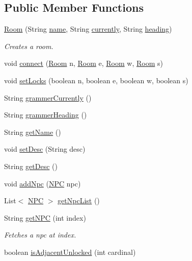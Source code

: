 \subsection*{Public Member Functions}
\begin{DoxyCompactItemize}
\item 
\hyperlink{classRoom_ae162f5cbb105a45bb5b72adcccfd250f}{Room} (String \hyperlink{classRoom_a30e9fb0290f64b567572d2f4b4fac4d9}{name}, String \hyperlink{classRoom_a2f0c64fd0d90618f9c36b935a6f6bb49}{currently}, String \hyperlink{classRoom_ad9e86528519166f3ac3b1413da4e0a41}{heading})
\begin{DoxyCompactList}\small\item\em Creates a room. \end{DoxyCompactList}\item 
void \hyperlink{classRoom_af82990e218a9dced9c6226b0083bfb8a}{connect} (\hyperlink{classRoom}{Room} n, \hyperlink{classRoom}{Room} e, \hyperlink{classRoom}{Room} w, \hyperlink{classRoom}{Room} s)
\item 
void \hyperlink{classRoom_a074e41e5dbc41dd4a71cac2a101c1f56}{set\+Locks} (boolean n, boolean e, boolean w, boolean s)
\item 
String \hyperlink{classRoom_aa0c9b6ddd98d29a9cc4e31c6c66a8ea4}{grammer\+Currently} ()
\item 
String \hyperlink{classRoom_a8d2578df19ba7b0d5c76c9567aba83df}{grammer\+Heading} ()
\item 
String \hyperlink{classRoom_ab638bfd4155075a97e6d3ec306b467f0}{get\+Name} ()
\item 
void \hyperlink{classRoom_adefdb50c618b7d7d91fb2025eefc39e0}{set\+Desc} (String desc)
\item 
String \hyperlink{classRoom_ad0996a895179c9ba712e5be94534e58e}{get\+Desc} ()
\item 
void \hyperlink{classRoom_ac6f911c07206b270b6d821f0b9a67a01}{add\+Npc} (\hyperlink{classNPC}{N\+P\+C} npc)
\item 
List$<$ \hyperlink{classNPC}{N\+P\+C} $>$ \hyperlink{classRoom_a0c5b0189a4149e963ac93965acbf8088}{get\+Npc\+List} ()
\item 
String \hyperlink{classRoom_a74ac6cc2152ba812702258b9c4fd70db}{get\+N\+P\+C} (int index)
\begin{DoxyCompactList}\small\item\em Fetches a npc at index. \end{DoxyCompactList}\item 
boolean \hyperlink{classRoom_aff32fa2f3e836c00921e18408a432a0d}{is\+Adjacent\+Unlocked} (int cardinal)

\end{DoxyCompactItemize}
